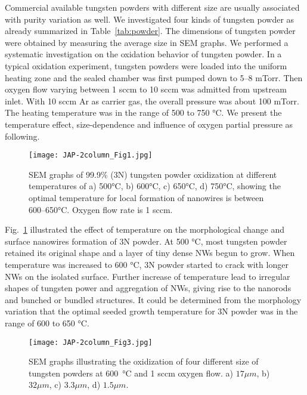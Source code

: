 Commercial available tungsten powders with different size are usually associated with purity variation as well. We investigated four kinds of tungsten powder as already summarized in Table~\ref{tab:powder}. The dimensions of tungsten powder were obtained by measuring the average size in SEM graphs. We performed a systematic investigation on the oxidation behavior of tungsten powder. In a typical oxidation experiment, tungsten powders were loaded into the uniform heating zone and the sealed chamber was first pumped down to 5--8 mTorr. Then oxygen flow varying between 1 sccm to 10 sccm was admitted from upstream inlet. With 10 sccm Ar as carrier gas, the overall pressure was about 100 mTorr. The heating temperature was in the range of 500 to 750 \si{\degreeCelsius}. We present the temperature effect, size-dependence and influence of oxygen partial pressure as following.
\begin{figure}[htb]
\centering
\texttt{[image: JAP-2column\_Fig1.jpg]}
\caption[W powder oxidation: temperature effect]{SEM graphs of 99.9\% (3N) tungsten powder oxidization at different temperatures of a) 500\si{\degreeCelsius}, b) 600\si{\degreeCelsius}, c) 650\si{\degreeCelsius}, d) 750\si{\degreeCelsius}, showing the optimal temperature for local formation of nanowires is between 600--650\si{\degreeCelsius}. Oxygen flow rate is 1 sccm.}
\label{fig:pdtemp}
\end{figure}

Fig.~\ref{fig:pdtemp} illustrated the effect of temperature on the morphological change and surface nanowires formation of 3N powder. At 500 \si{\degreeCelsius}, most tungsten powder retained its original shape and a layer of tiny dense NWs begun to grow. When temperature was increased to 600 \si{\degreeCelsius}, 3N powder started to crack with longer NWs on the isolated surface. Further increase of temperature lead to irregular shapes of tungsten power and aggregation of NWs, giving rise to the nanorods and bunched or bundled structures. It could be determined from the morphology variation that the optimal seeded growth temperature for 3N powder was in the range of 600 to 650 \si{\degreeCelsius}.
\begin{figure}[htb]
\centering
\texttt{[image: JAP-2column\_Fig3.jpg]}
\caption[W powder oxidation: size effect]{SEM graphs illustrating the oxidization of four different size of tungsten powders at 600~\si{\degreeCelsius} and 1 sccm oxygen flow. a) $17\mu m$, b) $32\mu m$, c) $3.3\mu m$, d) $1.5\mu m$.}
\label{fig:pdsize}
\end{figure}

